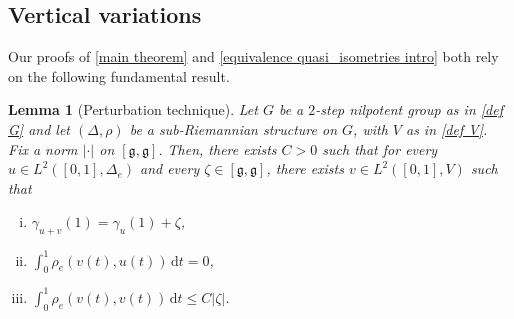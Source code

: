 \documentclass[a4paper,11pt,reqno]{amsart}
\theoremstyle{plain}
\newtheorem{lemma}[theorem]{Lemma}
\theoremstyle{definition}
\newtheorem{remark}[theorem]{Remark}
\newcommand{\g}{\mathfrak{g}}
\newcommand{\id}{e}
\newcommand{\de}{\mathrm{d}}
\begin{document}

\subsection{Vertical variations} Our proofs of \cref{main theorem} and \cref{equivalence quasi_isometries intro} both rely on the following fundamental result.

\begin{lemma}[Perturbation technique] \label{new_lemma}
 Let $G$ be a $2$-step nilpotent group as in \eqref{def G} and let $(\Delta,\rho)$ be a sub-Riemannian structure on $G$, with $V$ as in \eqref{def V}. Fix a norm $\lvert \cdot \rvert$ on $[\g,\g]$. Then, there exists $C>0$ such that for every $u \in L^2([0,1],\Delta_\id)$ and every $\zeta \in [\g,\g]$, there exists $v \in L^2([0,1],V)$ such that
 \begin{enumerate}[(i)]
 \item $\gamma_{u+v}(1)=\gamma_u(1)+\zeta$,
	\item $\int^1_0 \rho_\id(v(t),u(t))\, \de t =0$,
	\item $\int^1_0 \rho_\id(v(t),v(t))\, \de t \le C \lvert \zeta \rvert$.
\end{enumerate}
\end{lemma}
\end{document}
